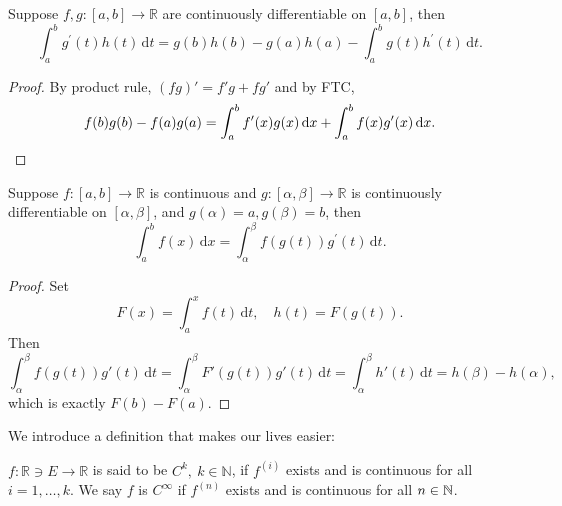 \begin{corollary}
    Suppose $f,g:[a,b]\to\mathbb R$ are continuously differentiable on $[a,b]$, then
    $$\int_a^bg^\prime(t)h(t)\,\mathrm dt=g(b)h(b)-g(a)h(a)-\int_a^bg(t)h^\prime(t)\,\mathrm dt.$$
\end{corollary}
\begin{proof}
    By product rule, $ (fg)'=f'g+fg' $ and by FTC,
    \[
        f(b)g(b)-f(a)g(a)=\int_{a}^{b} f'(x)g(x) \,\mathrm{d}x + \int_{a}^{b} f(x)g'(x) \,\mathrm{d}x.\qedhere
    \]
\end{proof}
\begin{corollary}
    Suppose $f:[a,b]\to\mathbb R$ is continuous and $g:[\alpha,\beta]\to\mathbb R$ is continuously differentiable on $ [\alpha,\beta] $, and $g(\alpha)=a, g(\beta)=b$, then
    $$\int_a^bf(x)\,\mathrm dx=\int_\alpha^\beta f(g(t))g^\prime(t)\,\mathrm dt.$$
\end{corollary}
\begin{proof}
    Set 
    \[
        F(x) = \int_{a}^{x} f(t) \,\mathrm{d}t,\quad h(t) = F(g(t)).
    \]
    Then
    \[
        \int_{\alpha}^{\beta} f(g(t))g'(t) \,\mathrm{d}t = \int_{\alpha}^{\beta} F'(g(t))g'(t) \,\mathrm{d}t = \int_{\alpha}^{\beta} h'(t) \,\mathrm{d}t = h(\beta)-h(\alpha),
    \]
    which is exactly $ F(b)-F(a) $.
\end{proof}

We introduce a definition that makes our lives easier:
\begin{definition}
    $ f: \mathbb{R} \ni E \to \mathbb{R}  $ is said to be $ C^k,\ k\in \mathbb{N} $, if $ f^{(i)} $ exists and is continuous for all $i=1,\dots,k$. We say $f$ is $ C^\infty $ if $ f^{(n)} $ exists and is continuous for all $n\in {\mathbb{N}}$.
\end{definition}

